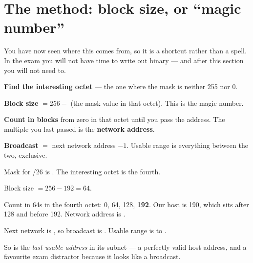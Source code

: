 \section{The method: block size, or ``magic number''}\label{sec:magic}

You have now seen where this comes from, so it is a shortcut rather than a spell.
In the exam you will not have time to write out binary --- and after this section
you will not need to.

\begin{conceptbox}
\begin{tightnum}
  \item \textbf{Find the interesting octet} --- the one where the mask is neither
        255 nor 0.
  \item \textbf{Block size} $= 256 -$ (the mask value in that octet). This is the
        magic number.
  \item \textbf{Count in blocks} from zero in that octet until you pass the
        address. The multiple you last passed is the \textbf{network address}.
  \item \textbf{Broadcast} $=$ next network address $-1$. Usable range is
        everything between the two, exclusive.
\end{tightnum}
\end{conceptbox}

\begin{worked}
\begin{tightnum}
  \item Mask for /26 is . The interesting octet is the
        fourth.
  \item Block size $= 256 - 192 = 64$.
  \item Count in 64s in the fourth octet: 0, 64, 128, \textbf{192}. Our host is
        190, which sits after 128 and before 192. Network address is
        .
  \item Next network is , so broadcast is
        . Usable range is  to
        .
\end{tightnum}
So  is the \emph{last usable address} in its subnet --- a perfectly
valid host address, and a favourite exam distractor because it looks like a
broadcast.
\end{worked}

